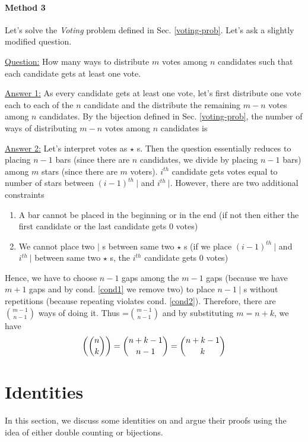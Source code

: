 \paragraph{Method 3} Let's solve the \emph{Voting} problem defined in Sec. \ref{voting-prob}. Let's ask a slightly modified question. 
\begin{description}
\item \underline{Question:} How many ways to distribute $m$ votes among $n$ candidates such that each candidate gets at least one vote.
\item \underline{Answer 1:} As every candidate gets at least one vote, let's first distribute one vote each to each of the $n$ candidate and the distribute the remaining $m-n$ votes among $n$ candidates. By the bijection defined in Sec. \ref{voting-prob}, the number of ways of distributing $m-n$ votes among $n$ candidates is   
\item \underline{Answer 2:} Let's interpret votes as $\star$ s. Then the question essentially reduces to placing $n-1$ bars (since there are $n$ candidates, we divide by placing $n-1$ bars) among $m$ stars (since there are $m$ voters). $i^{th}$ candidate gets votes equal to number of stars between $(i-1)^{th}~|$ and $i^{th}~|$. However, there are two additional constraints \begin{enumerate}
    \item\label{cond1} A bar cannot be placed in the beginning or in the end (if not then either the first candidate or the last candidate gets $0$ votes)
    \item\label{cond2} We cannot place two $|$ s between same two $\star$ s (if we place $(i-1)^{th}~|$ and $i^{th}~|$ between same two $\star$ s, the $i^{th}$ candidate gets $0$ votes)
\end{enumerate}
Hence, we have to choose $n-1$ gaps among the $m-1$ gaps (because we have $m+1$ gaps and by cond. \ref{cond1} we remove two) to place $n-1~|$ s without repetitions (because repeating violates cond. \ref{cond2}). Therefore, there are $\binom{m-1}{n-1}$ ways of doing it. Thus =$\binom{m-1}{n-1}$ and by substituting $m=n+k$, we have $$\textrm{$\left(\binom{n}{k}\right)$}=\binom{n+k-1}{n-1}=\binom{n+k-1}{k}$$
\end{description}
\section{Identities}
In this section, we discuss some identities on  and argue their proofs using the idea of either double counting or bijections.
